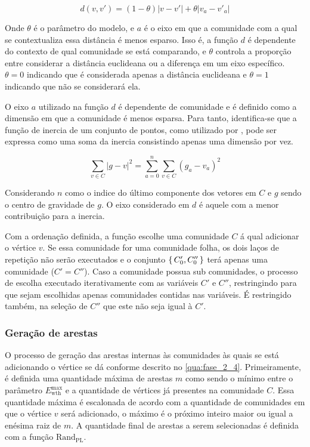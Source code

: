 \documentclass[notes.tex]{subfiles}
\begin{document}
\begin{equation}
d(v, v') = (1-\theta)|v-v'| + \theta|v_a - v'_a|
\end{equation}

Onde $\theta$ é o parâmetro do modelo, e  $a$ é o eixo em que a comunidade com a qual se contextualiza essa distância é menos esparso. 
Isso é, a função $d$ é dependente do contexto de qual comunidade se está comparando, e $\theta$ controla a proporção entre considerar a distância euclideana ou a diferença em um eixo específico.
$\theta = 0$ indicando que é considerada apenas a distância euclideana e $\theta = 1$ indicando que não se considerará ela.

O eixo $a$ utilizado na função $d$ é dependente de comunidade e é definido como a dimensão em que a comunidade é menos esparsa.
Para tanto, identifica-se que a função de inercia de um conjunto de pontos, como utilizado por , pode ser expressa como uma soma da inercia consistindo apenas uma dimensão por vez.

\begin{equation}
\sum_{v \in C} |g-v|^2 = \sum_{a=0}^{n}\sum_{v \in C}(g_a - v_a)^2
\end{equation}

Considerando $n$ como o indice do último componente dos vetores em $C$ e $g$ sendo o centro de gravidade de $g$.
O eixo considerado em $d$ é aquele com a menor contribuição para a inercia.

Com a ordenação definida, a função escolhe uma comunidade $C$ á qual adicionar o vértice $v$.
Se essa comunidade for uma comunidade folha, os dois laços de repetição não serão executados e o conjunto $\set{C'_0, C''_0}$ terá apenas uma comunidade ($C' = C''$).
Caso a comunidade possua sub comunidades, o processo de escolha executado iterativamente com as variáveis $C'$ e  $C''$, restringindo para que sejam escolhidas apenas comunidades contidas nas variáveis.
É restringido também, na seleção de $C''$ que este não seja igual à  $C'$.

\subsubsection{Geração de arestas}

O processo de geração das arestas internas às comunidades às quais se está adicionando o vértice se dá conforme descrito no \autoref{qua:fase_2_4}.
Primeiramente, é definida uma quantidade máxima de arestas $m$ como sendo o mínimo entre o parâmetro $E_\text{wth}^\text{max}$ e a quantidade de vértices já presentes na comunidade $C$.
Essa quantidade máxima é escalonada de acordo com a quantidade de comunidades em que o vértice $v$ será adicionado, o máximo é o próximo inteiro maior ou igual a enésima raiz de $m$.
A quantidade final de arestas a serem selecionadas é definida com a função $\text{Rand}_\text{PL}$.
\end{document}
